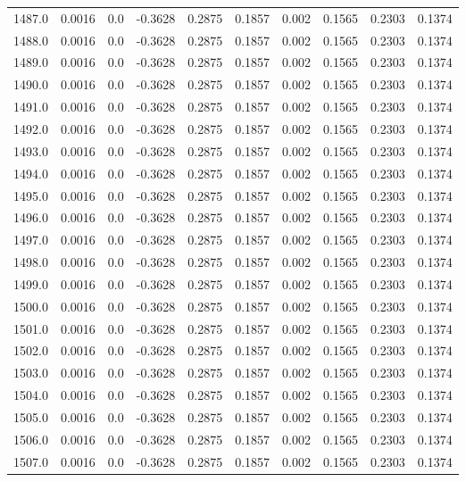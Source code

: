 \begin{longtable}{lrrrrrrrrr}
1487.0 & 0.0016 & 0.0 & -0.3628 & 0.2875 & 0.1857 & 0.002 & 0.1565 & 0.2303 & 0.1374 \\
1488.0 & 0.0016 & 0.0 & -0.3628 & 0.2875 & 0.1857 & 0.002 & 0.1565 & 0.2303 & 0.1374 \\
1489.0 & 0.0016 & 0.0 & -0.3628 & 0.2875 & 0.1857 & 0.002 & 0.1565 & 0.2303 & 0.1374 \\
1490.0 & 0.0016 & 0.0 & -0.3628 & 0.2875 & 0.1857 & 0.002 & 0.1565 & 0.2303 & 0.1374 \\
1491.0 & 0.0016 & 0.0 & -0.3628 & 0.2875 & 0.1857 & 0.002 & 0.1565 & 0.2303 & 0.1374 \\
1492.0 & 0.0016 & 0.0 & -0.3628 & 0.2875 & 0.1857 & 0.002 & 0.1565 & 0.2303 & 0.1374 \\
1493.0 & 0.0016 & 0.0 & -0.3628 & 0.2875 & 0.1857 & 0.002 & 0.1565 & 0.2303 & 0.1374 \\
1494.0 & 0.0016 & 0.0 & -0.3628 & 0.2875 & 0.1857 & 0.002 & 0.1565 & 0.2303 & 0.1374 \\
1495.0 & 0.0016 & 0.0 & -0.3628 & 0.2875 & 0.1857 & 0.002 & 0.1565 & 0.2303 & 0.1374 \\
1496.0 & 0.0016 & 0.0 & -0.3628 & 0.2875 & 0.1857 & 0.002 & 0.1565 & 0.2303 & 0.1374 \\
1497.0 & 0.0016 & 0.0 & -0.3628 & 0.2875 & 0.1857 & 0.002 & 0.1565 & 0.2303 & 0.1374 \\
1498.0 & 0.0016 & 0.0 & -0.3628 & 0.2875 & 0.1857 & 0.002 & 0.1565 & 0.2303 & 0.1374 \\
1499.0 & 0.0016 & 0.0 & -0.3628 & 0.2875 & 0.1857 & 0.002 & 0.1565 & 0.2303 & 0.1374 \\
1500.0 & 0.0016 & 0.0 & -0.3628 & 0.2875 & 0.1857 & 0.002 & 0.1565 & 0.2303 & 0.1374 \\
1501.0 & 0.0016 & 0.0 & -0.3628 & 0.2875 & 0.1857 & 0.002 & 0.1565 & 0.2303 & 0.1374 \\
1502.0 & 0.0016 & 0.0 & -0.3628 & 0.2875 & 0.1857 & 0.002 & 0.1565 & 0.2303 & 0.1374 \\
1503.0 & 0.0016 & 0.0 & -0.3628 & 0.2875 & 0.1857 & 0.002 & 0.1565 & 0.2303 & 0.1374 \\
1504.0 & 0.0016 & 0.0 & -0.3628 & 0.2875 & 0.1857 & 0.002 & 0.1565 & 0.2303 & 0.1374 \\
1505.0 & 0.0016 & 0.0 & -0.3628 & 0.2875 & 0.1857 & 0.002 & 0.1565 & 0.2303 & 0.1374 \\
1506.0 & 0.0016 & 0.0 & -0.3628 & 0.2875 & 0.1857 & 0.002 & 0.1565 & 0.2303 & 0.1374 \\
1507.0 & 0.0016 & 0.0 & -0.3628 & 0.2875 & 0.1857 & 0.002 & 0.1565 & 0.2303 & 0.1374 \\

\end{longtable}
